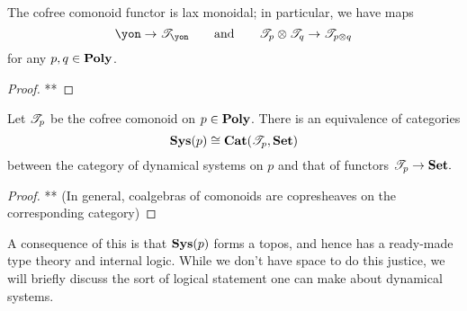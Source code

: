 \documentclass[Book-Poly]{subfiles}
\begin{document}
\begin{proposition}
The cofree comonoid functor is lax monoidal; in particular, we have maps
\[
\yon\to\cofree{\yon}
\qqand
\cofree{p}\otimes\cofree{q}\to\cofree{p\otimes q}
\]
for any $p,q\in\mathbf{Poly}$.
\end{proposition}
\begin{proof}
**
\end{proof}

\begin{theorem}\label{thm.cofree_coalgebras}
Let $\mathscr{T}_{p}$ be the cofree comonoid on $p\in\mathbf{Poly}$. There is an equivalence of categories
\[
\mathbf{Sys}(p)\cong\mathbf{Cat}(\mathscr{T}_{p},\mathbf{Set})
\]
between the category of dynamical systems on $p$ and that of functors $\mathscr{T}_{p}\to\mathbf{Set}.$
\end{theorem}
\begin{proof}
** (In general, coalgebras of comonoids are copresheaves on the corresponding category)
\end{proof}

A consequence of this is that $\mathbf{Sys}(p)$ forms a topos, and hence has a ready-made type theory and internal logic. While we don't have space to do this justice, we will briefly discuss the sort of logical statement one can make about dynamical systems.






\end{document}
